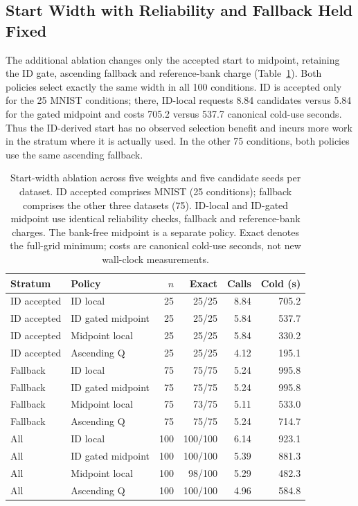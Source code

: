 \documentclass[make,article,submit,pdftex,moreauthors]{Definitions/mdpi}
\begin{document}
\subsection{Start Width with Reliability and Fallback Held Fixed}\label{sec:gated}
The additional ablation changes only the accepted start to midpoint,
retaining the ID gate, ascending fallback and reference-bank charge
(Table~\ref{tab:gated}). Both policies select exactly the same width
in all 100 conditions. ID is accepted only for the 25 MNIST conditions;
there, ID-local requests 8.84 candidates versus 5.84 for the gated
midpoint and costs 705.2 versus 537.7 canonical cold-use seconds.
Thus the ID-derived start has no observed selection benefit and incurs
more work in the stratum where it is actually used. In the other 75
conditions, both policies use the same ascending fallback.
\begin{table}[H]
\caption{Start-width ablation across five weights and five candidate seeds per dataset. ID accepted comprises MNIST (25 conditions); fallback comprises the other three datasets (75). ID-local and ID-gated midpoint use identical reliability checks, fallback and reference-bank charges. The bank-free midpoint is a separate policy. Exact denotes the full-grid minimum; costs are canonical cold-use seconds, not new wall-clock measurements.}\label{tab:gated}
\small
\setlength{\tabcolsep}{3pt}
\begin{tabular*}{\textwidth}{@{\extracolsep{\fill}}llrrrr@{}}
\toprule
Stratum & Policy & $n$ & Exact & Calls & Cold (s) \\
\midrule
ID accepted & ID local & 25 & 25/25 & 8.84 & 705.2 \\
ID accepted & ID gated midpoint & 25 & 25/25 & 5.84 & 537.7 \\
ID accepted & Midpoint local & 25 & 25/25 & 5.84 & 330.2 \\
ID accepted & Ascending Q & 25 & 25/25 & 4.12 & 195.1 \\
Fallback & ID local & 75 & 75/75 & 5.24 & 995.8 \\
Fallback & ID gated midpoint & 75 & 75/75 & 5.24 & 995.8 \\
Fallback & Midpoint local & 75 & 73/75 & 5.11 & 533.0 \\
Fallback & Ascending Q & 75 & 75/75 & 5.24 & 714.7 \\
All & ID local & 100 & 100/100 & 6.14 & 923.1 \\
All & ID gated midpoint & 100 & 100/100 & 5.39 & 881.3 \\
All & Midpoint local & 100 & 98/100 & 5.29 & 482.3 \\
All & Ascending Q & 100 & 100/100 & 4.96 & 584.8 \\
\bottomrule\end{tabular*}
\end{table}
\end{document}
